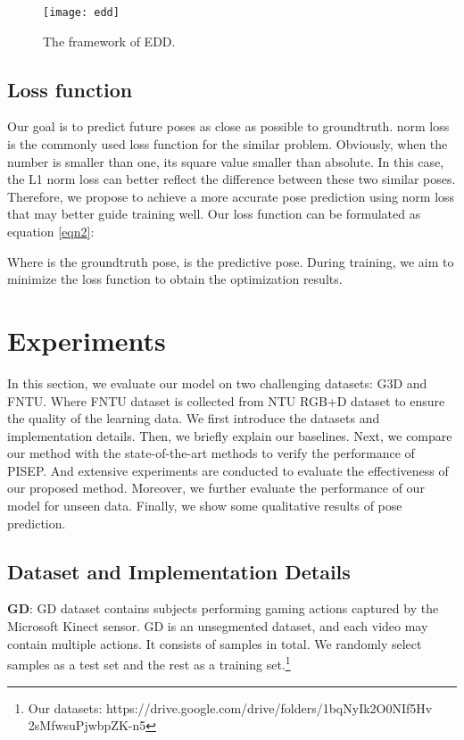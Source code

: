 \documentclass[journal]{IEEEtran}
\begin{document}
\begin{figure*}[!t]
\centering
\texttt{[image: edd]}
\caption{The framework of EDD.}
\label{edd}
\end{figure*}

\subsection{Loss function}
Our goal is to predict future poses as close as possible to groundtruth.  norm loss is the commonly used loss function for the similar problem. Obviously, when the number is smaller than one, its square value smaller than absolute. In this case, the L1 norm loss can better reflect the difference between these two similar poses. Therefore, we propose to achieve a more accurate pose prediction using  norm loss that may better guide training well. Our loss function can be formulated as equation \ref{eqn2}:


Where  is the groundtruth pose,  is the predictive pose. During training, we aim to minimize the loss function to obtain the optimization results.

\section{Experiments}

In this section, we evaluate our model on two challenging datasets: G3D \cite{g3d} and FNTU. Where FNTU dataset is collected from NTU RGB+D \cite{AmirNTU} dataset to ensure the quality of the learning data. We first introduce the datasets and implementation details. Then, we briefly explain our baselines. Next, we compare our method with the state-of-the-art methods to verify the performance of PISEP. And extensive experiments are conducted to evaluate the effectiveness of our proposed method. Moreover, we further evaluate the performance of our model for unseen data. Finally, we show some qualitative results of pose prediction.

\subsection{Dataset and Implementation Details}

{\bf GD}: GD \cite{g3d} dataset contains  subjects performing  gaming actions captured by the Microsoft Kinect sensor. GD is an unsegmented dataset, and each video may contain multiple actions. It consists of  samples in total. We randomly select  samples as a test set and the rest as a training set.\footnote {\label{dataset} Our datasets: https://drive.google.com/drive/folders/1bqNyIk2O0NIf5Hv
2sMfwsuPjwbpZK-n5}
\end{document}
